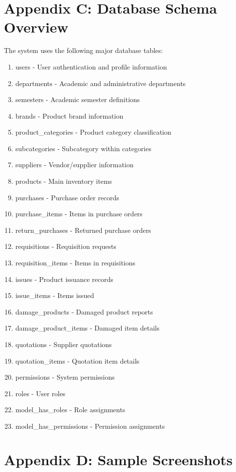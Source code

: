 \section{Appendix C: Database Schema Overview}

The system uses the following major database tables:

\begin{enumerate}
    \item users - User authentication and profile information
    \item departments - Academic and administrative departments
    \item semesters - Academic semester definitions
    \item brands - Product brand information
    \item product\_categories - Product category classification
    \item subcategories - Subcategory within categories
    \item suppliers - Vendor/supplier information
    \item products - Main inventory items
    \item purchases - Purchase order records
    \item purchase\_items - Items in purchase orders
    \item return\_purchases - Returned purchase orders
    \item requisitions - Requisition requests
    \item requisition\_items - Items in requisitions
    \item issues - Product issuance records
    \item issue\_items - Items issued
    \item damage\_products - Damaged product reports
    \item damage\_product\_items - Damaged item details
    \item quotations - Supplier quotations
    \item quotation\_items - Quotation item details
    \item permissions - System permissions
    \item roles - User roles
    \item model\_has\_roles - Role assignments
    \item model\_has\_permissions - Permission assignments
\end{enumerate}

\section{Appendix D: Sample Screenshots}


